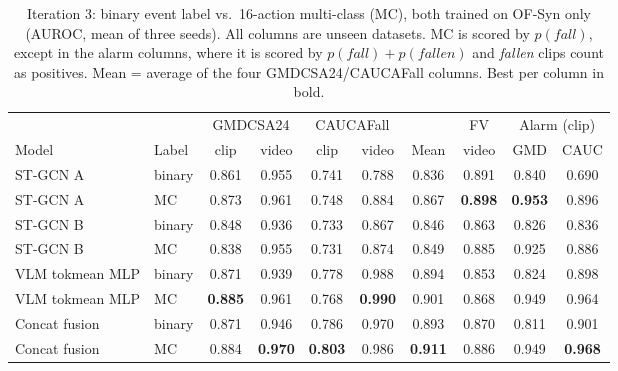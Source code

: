 \begin{table}[t]
  \caption{Iteration 3: binary event label vs.\ 16-action multi-class (MC), both trained on OF-Syn only (AUROC, mean of three seeds). All columns are unseen datasets. MC is scored by $p(\textit{fall})$, except in the alarm columns, where it is scored by $p(\textit{fall})+p(\textit{fallen})$ and \emph{fallen} clips count as positives. Mean = average of the four GMDCSA24/CAUCAFall columns. Best per column in bold.}
  \label{tab:iter3}
  \centering\small
  \begin{tabular*}{\textwidth}{@{\extracolsep{\fill}}llcccccccc}
    \toprule
    & & \multicolumn{2}{c}{GMDCSA24} & \multicolumn{2}{c}{CAUCAFall} & & FV & \multicolumn{2}{c}{Alarm (clip)} \\
    Model & Label & clip & video & clip & video & Mean & video & GMD & CAUC \\
    \midrule
    ST-GCN A & binary & 0.861 & 0.955 & 0.741 & 0.788 & 0.836 & 0.891 & 0.840 & 0.690 \\
    ST-GCN A & MC & 0.873 & 0.961 & 0.748 & 0.884 & 0.867 & \textbf{0.898} & \textbf{0.953} & 0.896 \\
    \midrule
    ST-GCN B & binary & 0.848 & 0.936 & 0.733 & 0.867 & 0.846 & 0.863 & 0.826 & 0.836 \\
    ST-GCN B & MC & 0.838 & 0.955 & 0.731 & 0.874 & 0.849 & 0.885 & 0.925 & 0.886 \\
    \midrule
    VLM tokmean MLP & binary & 0.871 & 0.939 & 0.778 & 0.988 & 0.894 & 0.853 & 0.824 & 0.898 \\
    VLM tokmean MLP & MC & \textbf{0.885} & 0.961 & 0.768 & \textbf{0.990} & 0.901 & 0.868 & 0.949 & 0.964 \\
    \midrule
    Concat fusion & binary & 0.871 & 0.946 & 0.786 & 0.970 & 0.893 & 0.870 & 0.811 & 0.901 \\
    Concat fusion & MC & 0.884 & \textbf{0.970} & \textbf{0.803} & 0.986 & \textbf{0.911} & 0.886 & 0.949 & \textbf{0.968} \\
    \bottomrule
  \end{tabular*}
\end{table}

